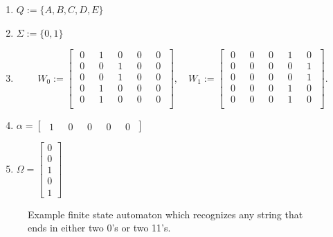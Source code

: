 \documentclass{amsbook}
\theoremstyle{plain}
\theoremstyle{definition}
\theoremstyle{remark}
\begin{document}
\begin{enumerate}
\item $Q:=\{A,B,C,D,E\}$
\item $\Sigma:=\{0,1\}$
\item
$$W_0:=
\begin{bmatrix}
\,\,0\,\,&\,\,1\,\,&\,\,0\,\,&\,\,0\,\,&\,\,0\,\,\\
\,\,0\,\,&\,\,0\,\,&\,\,1\,\,&\,\,0\,\,&\,\,0\,\,\\
\,\,0\,\,&\,\,0\,\,&\,\,1\,\,&\,\,0\,\,&\,\,0\,\,\\
\,\,0\,\,&\,\,1\,\,&\,\,0\,\,&\,\,0\,\,&\,\,0\,\,\\
\,\,0\,\,&\,\,1\,\,&\,\,0\,\,&\,\,0\,\,&\,\,0\,\,\\
\end{bmatrix},\quad W_1:=
\begin{bmatrix}
\,\,0\,\,&\,\,0\,\,&\,\,0\,\,&\,\,1\,\,&\,\,0\,\,\\
\,\,0\,\,&\,\,0\,\,&\,\,0\,\,&\,\,0\,\,&\,\,1\,\,\\
\,\,0\,\,&\,\,0\,\,&\,\,0\,\,&\,\,0\,\,&\,\,1\,\,\\
\,\,0\,\,&\,\,0\,\,&\,\,0\,\,&\,\,1\,\,&\,\,0\,\,\\
\,\,0\,\,&\,\,0\,\,&\,\,0\,\,&\,\,1\,\,&\,\,0\,\,\\
\end{bmatrix}.$$
\item $\alpha = \begin{bmatrix}\,\,1\,\,&\,\,0\,\,&\,\,0\,\,&\,\,0\,\,&\,\,0\,\,\end{bmatrix}$
\item $\Omega = \begin{bmatrix}0\\0\\1\\0\\1\end{bmatrix}$
\end{enumerate}

\begin{figure}
\caption{Example finite state automaton which recognizes any string that ends in either two 0's or two 11's. \label{fig:automaton1}}
\end{figure}
\end{document}
